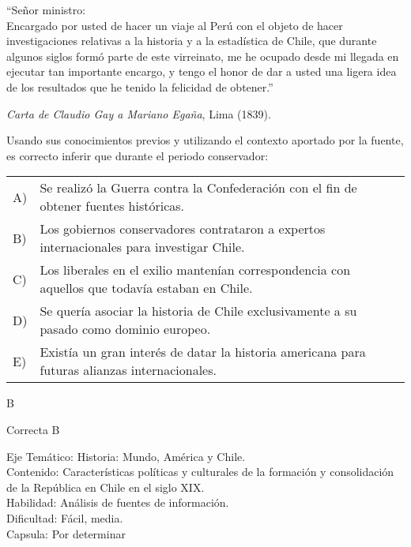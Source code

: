 \documentclass[letterpaper,11pt]{article}
\newcommand{\anchopregunta}{0.9\textwidth}
\begin{document}
\begin{enumerate}
\begin{minipage}{\anchopregunta}
\item ``Señor ministro:\\
Encargado por usted de hacer un viaje al Perú con el objeto de hacer investigaciones relativas a la historia y a la estadística de Chile, que durante algunos siglos formó parte de este virreinato, me he ocupado desde mi llegada en ejecutar tan importante encargo, y tengo el honor de dar a usted una ligera idea de los resultados que he tenido la felicidad de obtener.''
\begin{flushright}
\textit{Carta de Claudio Gay a Mariano Egaña}, Lima (1839).
\end{flushright}
Usando sus conocimientos previos y utilizando el contexto aportado por la fuente, es correcto inferir que durante el periodo conservador:
\begin{flushleft}\begin{tabular}{@{\hspace{-.001\textwidth}}l@{\hspace{2pt}}p{}}
A)& Se realizó la Guerra contra la Confederación con el fin de obtener fuentes históricas.\\
B)& Los gobiernos conservadores contrataron a expertos internacionales para investigar Chile.\\
C)& Los liberales en el exilio mantenían correspondencia con aquellos que todavía estaban en Chile. \\
D)& Se quería asociar la historia de Chile exclusivamente a su pasado como dominio europeo.\\
E)& Existía un gran interés de datar la historia americana para futuras alianzas internacionales.\\ 
\end{tabular}\end{flushleft}%
\begin{key} B
\end{key} 
\begin{hint}
\end{hint}
\begin{answer} Correcta B \\
\end{answer}
\begin{info} %
\begin{flushleft}
Eje Temático: Historia: Mundo, América y Chile.\\
Contenido: Características políticas y culturales de la formación y consolidación de la República en Chile en el siglo XIX.\\
Habilidad: Análisis de fuentes de información.\\
Dificultad: Fácil, media.\\
Capsula: Por determinar \\
\end{flushleft} 
\end{info}
\end{minipage}\vfill$\;$ %


\end{enumerate}
\end{document}
